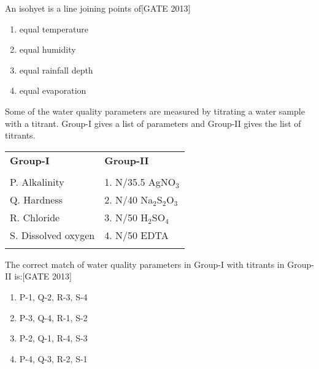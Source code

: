     \item An isohyet is a line joining points of\hfill{[GATE 2013]}
    
    \begin{multicols}{2}
    \begin{enumerate}
        \item equal temperature
        \item equal humidity
        \item equal rainfall depth
        \item equal evaporation
    \end{enumerate}
    \end{multicols}

    \item Some of the water quality parameters are measured by titrating a water sample with a titrant. Group-I gives a list of parameters and Group-II gives the list of titrants.
    
    \begin{center}
    \begin{tabular}{ p{4cm} p{4cm}}
       
        \textbf{Group-I} & \textbf{Group-II} \\
       \\
        P. Alkalinity & 1. N/35.5 AgNO$_3$ \\
        Q. Hardness & 2. N/40 Na$_2$S$_2$O$_3$ \\
        R. Chloride & 3. N/50 H$_2$SO$_4$ \\
        S. Dissolved oxygen & 4. N/50 EDTA \\\\
       
    \end{tabular}
    \end{center}

    The correct match of water quality parameters in Group-I with titrants in Group-II is:\hfill{[GATE 2013]}
    
    \begin{multicols}{2}
    \begin{enumerate}
        \item P-1, Q-2, R-3, S-4
        \item P-3, Q-4, R-1, S-2
        \item P-2, Q-1, R-4, S-3
        \item P-4, Q-3, R-2, S-1
    \end{enumerate}
    \end{multicols}

